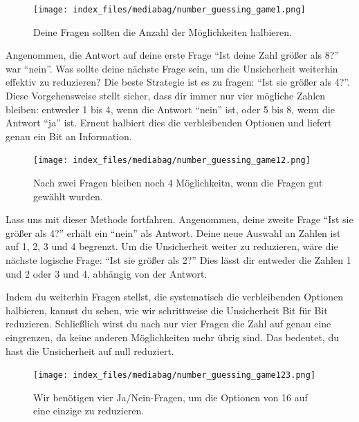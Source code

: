 \documentclass[
  letterpaper,
  DIV=11]{scrreprt}
\begin{document}
\begin{figure}[H]

{\centering \texttt{[image: index\_files/mediabag/number\_guessing\_game1.png]}

}

\caption{Deine Fragen sollten die Anzahl der Möglichkeiten halbieren.}

\end{figure}%

Angenommen, die Antwort auf deine erste Frage ``Ist deine Zahl größer
als 8?'' war ``nein''. Was sollte deine nächste Frage sein, um die
Unsicherheit weiterhin effektiv zu reduzieren? Die beste Strategie ist
es zu fragen: ``Ist sie größer als 4?''. Diese Vorgehensweise stellt
sicher, dass dir immer nur vier mögliche Zahlen bleiben: entweder 1 bis
4, wenn die Antwort ``nein'' ist, oder 5 bis 8, wenn die Antwort ``ja''
ist. Erneut halbiert dies die verbleibenden Optionen und liefert genau
ein Bit an Information.

\begin{figure}[H]

{\centering \texttt{[image: index\_files/mediabag/number\_guessing\_game12.png]}

}

\caption{Nach zwei Fragen bleiben noch 4 Möglichkeitn, wenn die Fragen
gut gewählt wurden.}

\end{figure}%

Lass uns mit dieser Methode fortfahren. Angenommen, deine zweite Frage
``Ist sie größer als 4?'' erhält ein ``nein'' als Antwort. Deine neue
Auswahl an Zahlen ist auf 1, 2, 3 und 4 begrenzt. Um die Unsicherheit
weiter zu reduzieren, wäre die nächste logische Frage: ``Ist sie größer
als 2?'' Dies lässt dir entweder die Zahlen 1 und 2 oder 3 und 4,
abhängig von der Antwort.

Indem du weiterhin Fragen stellst, die systematisch die verbleibenden
Optionen halbieren, kannst du sehen, wie wir schrittweise die
Unsicherheit Bit für Bit reduzieren. Schließlich wirst du nach nur vier
Fragen die Zahl auf genau eine eingrenzen, da keine anderen
Möglichkeiten mehr übrig sind. Das bedeutet, du hast die Unsicherheit
auf null reduziert.

\begin{figure}[H]

{\centering \texttt{[image: index\_files/mediabag/number\_guessing\_game123.png]}

}

\caption{Wir benötigen vier Ja/Nein-Fragen, um die Optionen von 16 auf
eine einzige zu reduzieren.}

\end{figure}%
\end{document}
